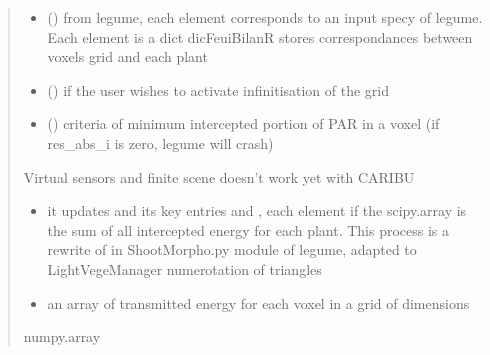 \documentclass[letterpaper,10pt,english]{sphinxmanual}
\begin{document}
\begin{fulllineitems}
\begin{quote}
\begin{description}
\begin{itemize}
\item {} 
\sphinxAtStartPar
{} () \textendash{} from l\sphinxhyphen{}egume, each element corresponds to an input specy of l\sphinxhyphen{}egume. Each element is a dict dicFeuiBilanR stores correspondances between voxels grid and each plant

\item {} 
\sphinxAtStartPar
{} () \textendash{} if the user wishes to activate infinitisation of the grid

\item {} 
\sphinxAtStartPar
{} () \textendash{} criteria of minimum intercepted portion of PAR in a voxel (if res\_abs\_i is zero, l\sphinxhyphen{}egume will crash)

\end{itemize}

\sphinxAtStartPar
{} \textendash{} Virtual sensors and finite scene doesn’t work yet with CARIBU

\sphinxAtStartPar
\begin{itemize}
\item {} 
\sphinxAtStartPar
it updates  and its key entries  and , each element if the scipy.array is the sum of all intercepted energy for each plant. This process is a rewrite of  in ShootMorpho.py module of l\sphinxhyphen{}egume, adapted to LightVegeManager numerotation of triangles

\item {} 
\sphinxAtStartPar
{} an array of transmitted energy for each voxel in a grid of dimensions 

\end{itemize}


\sphinxAtStartPar
numpy.array

\end{description}\end{quote}

\end{fulllineitems}
\end{document}
